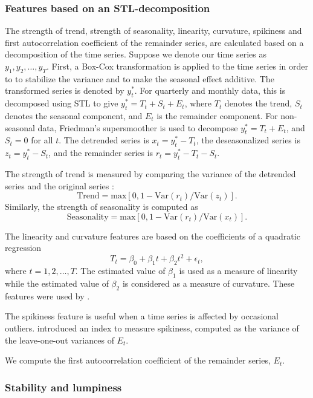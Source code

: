 \documentclass[11pt,a4paper,]{article}
\def\var{\text{Var}}
\theoremstyle{definition}
\theoremstyle{definition}
\theoremstyle{definition}
\theoremstyle{remark}
\begin{document}
\subsubsection*{Features based on an
STL-decomposition}\label{features-based-on-an-stl-decomposition}

The strength of trend, strength of seasonality, linearity, curvature,
spikiness and first autocorrelation coefficient of the remainder series,
are calculated based on a decomposition of the time series. Suppose we
denote our time series as \(y_1, y_2, \dots,y_T\). First, a Box-Cox
transformation is applied to the time series in order to to stabilize
the variance and to make the seasonal effect additive. The transformed
series is denoted by \(y_{t}^*\). For quarterly and monthly data, this
is decomposed using STL \autocite{cleveland1990stl} to give
\(y_t^*=T_t+S_t+E_t\), where \(T_t\) denotes the trend, \(S_t\) denotes
the seasonal component, and \(E_t\) is the remainder component. For
non-seasonal data, Friedman's supersmoother \autocite{supsmu} is used to
decompose \(y_t^*=T_t+E_t\), and \(S_t=0\) for all \(t\). The detrended
series is \(x_t=y_t^*-T_t\), the deseasonalized series is
\(z_t=y_t^*-S_t\), and the remainder series is \(r_t=y_t^*-T_t-S_t\).

The strength of trend is measured by comparing the variance of the
detrended series and the original series \autocite{wang2009rule}: \[
    \text{Trend} = \text{max}\left[0, 1 - \var(r_{t})/\var(z_{t})\right].
\] Similarly, the strength of seasonality is computed as \[
    \text{Seasonality} = \text{max}\left[0, 1- \var(r_{t})/ \var(x_{t})\right].
\]

The linearity and curvature features are based on the coefficients of a
quadratic regression \[
  T_t=\beta_0+\beta_1 t + \beta_2t^2+\epsilon_t,
\] where \(t=1, 2, \dots,T\). The estimated value of \(\beta_1\) is used
as a measure of linearity while the estimated value of \(\beta_2\) is
considered as a measure of curvature. These features were used by
\textcite{hyndman2015large}.

The spikiness feature is useful when a time series is affected by
occasional outliers. \textcite{hyndman2015large} introduced an index to
measure spikiness, computed as the variance of the leave-one-out
variances of \(E_t\).

We compute the first autocorrelation coefficient of the remainder
series, \(E_t\).

\subsubsection*{Stability and lumpiness}\label{stability-and-lumpiness}
\end{document}
